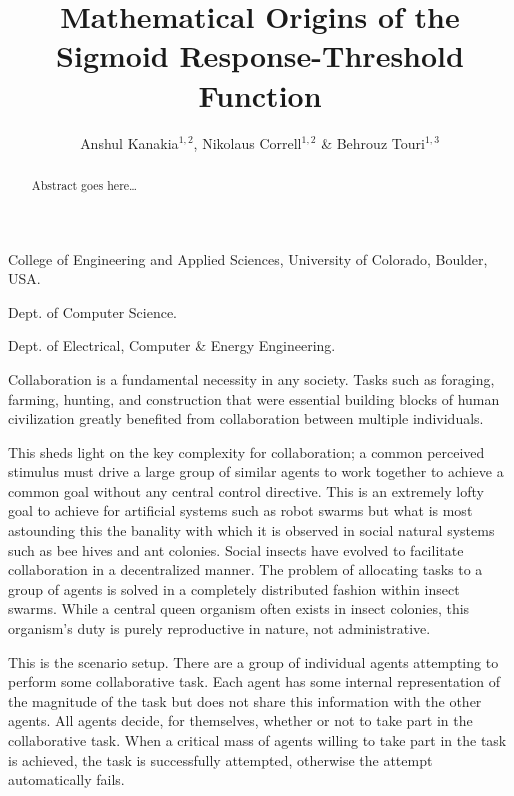 \documentclass{nature}
\title{Mathematical Origins of the Sigmoid Response-Threshold Function}
\author{Anshul Kanakia$^{1,2}$, Nikolaus Correll$^{1,2}$ \& Behrouz Touri$^{1,3}$}
\begin{document}
\maketitle

\begin{affiliations}
 \item College of Engineering and Applied Sciences, University of Colorado, Boulder, USA. 
 \item Dept. of Computer Science.
 \item Dept. of Electrical, Computer \& Energy Engineering.
\end{affiliations}

\begin{abstract}
Abstract goes here\ldots
\end{abstract}

Collaboration is a fundamental necessity in any society. Tasks such as foraging, farming, hunting, and construction that were essential building blocks of human civilization greatly benefited from collaboration between multiple individuals. 

This sheds light on the key complexity for collaboration; a common perceived stimulus must drive a large group of similar agents to work together to achieve a common goal without any central control directive. This is an extremely lofty goal to achieve for artificial systems such as robot swarms but what is most astounding this the banality with which it is observed in social natural systems such as bee hives and ant colonies. Social insects have evolved to facilitate collaboration in a decentralized manner. The problem of allocating tasks to a group of agents is solved in a completely distributed fashion within insect swarms. While a central queen organism often exists in insect colonies, this organism's duty is purely reproductive in nature, not administrative.

This is the scenario setup. There are a group of individual agents attempting to perform some collaborative task. Each agent has some internal representation of the magnitude of the task but does not share this information with the other agents. All agents decide, for themselves, whether or not to take part in the collaborative task. When a critical mass of agents willing to take part in the task is achieved, the task is successfully attempted, otherwise the attempt automatically fails.
\end{document}
